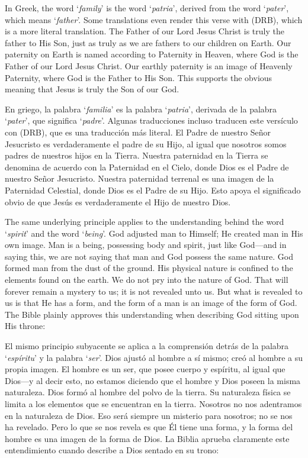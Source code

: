 In Greek, the word ‘\textit{family}’ is the word ‘\textit{patria}’, derived from the word ‘\textit{pater}’, which means ‘\textit{father}’. Some translations even render this verse with  (DRB), which is a more literal translation. The Father of our Lord Jesus Christ is truly the father to His Son, just as truly as we are fathers to our children on Earth. Our paternity on Earth is named according to Paternity in Heaven, where God is the Father of our Lord Jesus Christ. Our earthly paternity is an image of Heavenly Paternity, where God is the Father to His Son. This supports the obvious meaning that Jesus is truly the Son of our God.


En griego, la palabra ‘\textit{familia}’ es la palabra ‘\textit{patria}’, derivada de la palabra ‘\textit{pater}’, que significa ‘\textit{padre}’. Algunas traducciones incluso traducen este versículo con  (DRB), que es una traducción más literal. El Padre de nuestro Señor Jesucristo es verdaderamente el padre de su Hijo, al igual que nosotros somos padres de nuestros hijos en la Tierra. Nuestra paternidad en la Tierra se denomina de acuerdo con la Paternidad en el Cielo, donde Dios es el Padre de nuestro Señor Jesucristo. Nuestra paternidad terrenal es una imagen de la Paternidad Celestial, donde Dios es el Padre de su Hijo. Esto apoya el significado obvio de que Jesús es verdaderamente el Hijo de nuestro Dios.


The same underlying principle applies to the understanding behind the word ‘\textit{spirit}’ and the word ‘\textit{being}’. God adjusted man to Himself; He created man in His own image. Man is a being, possessing body and spirit, just like God—and in saying this, we are not saying that man and God possess the same nature. God formed man from the dust of the ground. His physical nature is confined to the elements found on the earth. We do not pry into the nature of God. That will forever remain a mystery to us; it is not revealed unto us. But what is revealed to us is that He has a form, and the form of a man is an image of the form of God. The Bible plainly approves this understanding when describing God sitting upon His throne:


El mismo principio subyacente se aplica a la comprensión detrás de la palabra ‘\textit{espíritu}’ y la palabra ‘\textit{ser}’. Dios ajustó al hombre a sí mismo; creó al hombre a su propia imagen. El hombre es un ser, que posee cuerpo y espíritu, al igual que Dios—y al decir esto, no estamos diciendo que el hombre y Dios poseen la misma naturaleza. Dios formó al hombre del polvo de la tierra. Su naturaleza física se limita a los elementos que se encuentran en la tierra. Nosotros no nos adentramos en la naturaleza de Dios. Eso será siempre un misterio para nosotros; no se nos ha revelado. Pero lo que se nos revela es que Él tiene una forma, y la forma del hombre es una imagen de la forma de Dios. La Biblia aprueba claramente este entendimiento cuando describe a Dios sentado en su trono:


